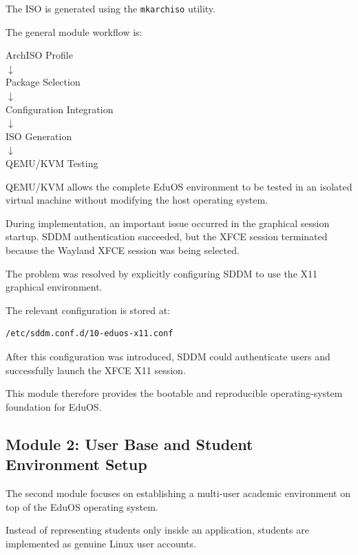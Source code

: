 \documentclass{tietreport}
\begin{document}
The ISO is generated using the \texttt{mkarchiso} utility.

The general module workflow is:

\begin{center}
ArchISO Profile \\[2mm]
$\downarrow$ \\[2mm]
Package Selection \\[2mm]
$\downarrow$ \\[2mm]
Configuration Integration \\[2mm]
$\downarrow$ \\[2mm]
ISO Generation \\[2mm]
$\downarrow$ \\[2mm]
QEMU/KVM Testing
\end{center}

QEMU/KVM allows the complete EduOS environment to be tested in an
isolated virtual machine without modifying the host operating
system.

During implementation, an important issue occurred in the graphical
session startup. SDDM authentication succeeded, but the XFCE session
terminated because the Wayland XFCE session was being selected.

The problem was resolved by explicitly configuring SDDM to use the
X11 graphical environment.

The relevant configuration is stored at:

\begin{verbatim}
/etc/sddm.conf.d/10-eduos-x11.conf
\end{verbatim}

After this configuration was introduced, SDDM could authenticate
users and successfully launch the XFCE X11 session.

This module therefore provides the bootable and reproducible
operating-system foundation for EduOS.



\subsection{Module 2: User Base and Student Environment Setup}

The second module focuses on establishing a multi-user academic
environment on top of the EduOS operating system.

Instead of representing students only inside an application,
students are implemented as genuine Linux user accounts.
\end{document}
